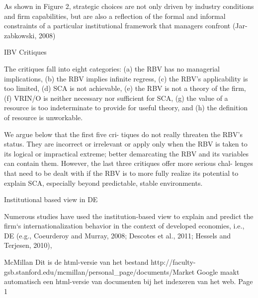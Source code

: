 As shown in Figure 2, strategic choices are not only driven by industry conditions and firm capabilities, but are also a reflection of the formal and informal constraints of a particular institutional framework that managers confront (Jar- zabkowski, 2008)



IBV Critiques

The critiques fall into eight categories: 
(a) the RBV has no managerial implications, 
(b) the RBV implies infinite regress, 
(c) the RBV’s applicability is too limited, 
(d) SCA is not achievable, 
(e) the RBV is not a theory of the firm, 
(f) VRIN/O is neither necessary nor sufficient for SCA, 
(g) the value of a resource is too indeterminate to provide for useful theory, and 
(h) the definition of resource is unworkable.


 We argue below that the first five cri- tiques do not really threaten the RBV’s status. They are incorrect or irrelevant or apply only when the RBV is taken to its logical or impractical extreme; better demarcating the RBV and its variables can contain them. However, the last three critiques offer more serious chal- lenges that need to be dealt with if the RBV is to more fully realize its potential to explain SCA, especially beyond predictable, stable environments.
 


Institutional based view in DE

Numerous studies have used the institution-based view to explain and predict the firm‘s internationalization behavior in the context of developed economies, i.e., DE (e.g., Coeurderoy and Murray, 2008; Descotes et al., 2011; Hessels and Terjesen, 2010),







McMillan
Dit is de html-versie van het bestand http://faculty-gsb.stanford.edu/mcmillan/personal_page/documents/Market%
Google maakt automatisch een html-versie van documenten bij het indexeren van het web.
Page 1
